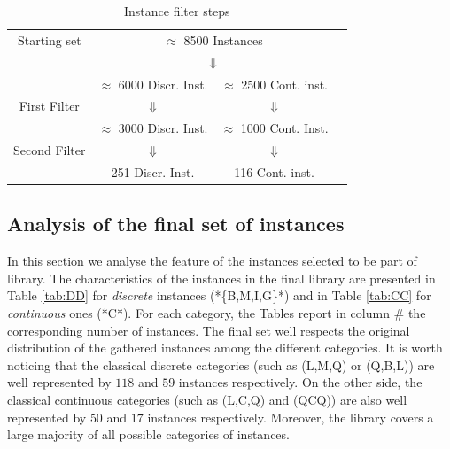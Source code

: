 \begin{center}
\begin{table}[]
 \centering
 \setlength{\tabcolsep}{5pt}
\begin{tabular}{cccc}
Starting set& \multicolumn{ 2}{c}{ $\approx$ 8500 Instances }& \\
& \multicolumn{ 2}{c}{$\Downarrow$}& \\
& $\approx$ 6000 Discr. Inst.  & $\approx$ 2500 Cont. inst. & \\
First Filter  & $\Downarrow$  & $\Downarrow$ & \\
 & $\approx$ 3000 Discr. Inst.  & $\approx$ 1000 Cont. Inst. & \\
Second Filter & $\Downarrow$  & $\Downarrow$  & \\
  & 251 Discr. Inst.  & 116  Cont. inst. & \\
\end{tabular}
\caption{Instance filter steps} \label{tab:filters}
\end{table}
\end{center}

\subsection{Analysis of the final set of instances}\label{subsec:final set}

In this section we analyse the feature of the instances selected to be
part of library.
The characteristics of the instances in the final library are
presented in Table \ref{tab:DD} for \emph{discrete} instances
(*\{B,M,I,G\}*) and in Table \ref{tab:CC} for
\emph{continuous} ones (*C*).
For each category, the Tables report in column $\#$ the corresponding
number of instances.
The final set well respects the original distribution of the gathered
instances among the different categories.
It is worth noticing that the classical discrete categories (such as
(L,M,Q) or (Q,B,L)) are well represented by $118$ and $59$  instances
respectively. On the other side, the classical continuous categories
(such as (L,C,Q) and (QCQ)) are also well represented by $50$ and $17$
 instances respectively.
Moreover, the library covers a large majority of all possible
categories of instances.


